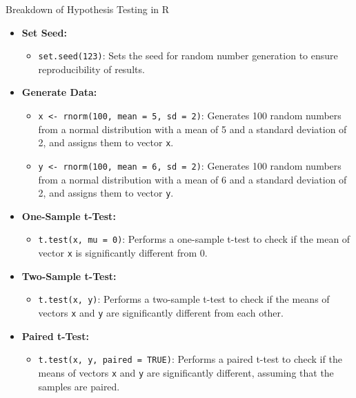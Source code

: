 \documentclass[serif, 9pt, aspectratio=32]{beamer}
\begin{document}
\begin{frame}{Breakdown of Hypothesis Testing in R}
    \begin{itemize}
        \setlength{\itemsep}{2em}
        \item \textbf{Set Seed:}
              \begin{itemize}
                  \item \texttt{set.seed(123)}: Sets the seed for random number generation to ensure reproducibility of results.
              \end{itemize}

        \item \textbf{Generate Data:}
              \begin{itemize}
                  \item \texttt{x <- rnorm(100, mean = 5, sd = 2)}: Generates 100 random numbers from a normal distribution with a mean of 5 and a standard deviation of 2, and assigns them to vector \texttt{x}.
                  \item \texttt{y <- rnorm(100, mean = 6, sd = 2)}: Generates 100 random numbers from a normal distribution with a mean of 6 and a standard deviation of 2, and assigns them to vector \texttt{y}.
              \end{itemize}

        \item \textbf{One-Sample t-Test:}
              \begin{itemize}
                  \item \texttt{t.test(x, mu = 0)}: Performs a one-sample t-test to check if the mean of vector \texttt{x} is significantly different from 0.
              \end{itemize}

        \item \textbf{Two-Sample t-Test:}
              \begin{itemize}
                  \item \texttt{t.test(x, y)}: Performs a two-sample t-test to check if the means of vectors \texttt{x} and \texttt{y} are significantly different from each other.
              \end{itemize}

        \item \textbf{Paired t-Test:}
              \begin{itemize}
                  \item \texttt{t.test(x, y, paired = TRUE)}: Performs a paired t-test to check if the means of vectors \texttt{x} and \texttt{y} are significantly different, assuming that the samples are paired.
              \end{itemize}
    \end{itemize}
\end{frame}
\end{document}
